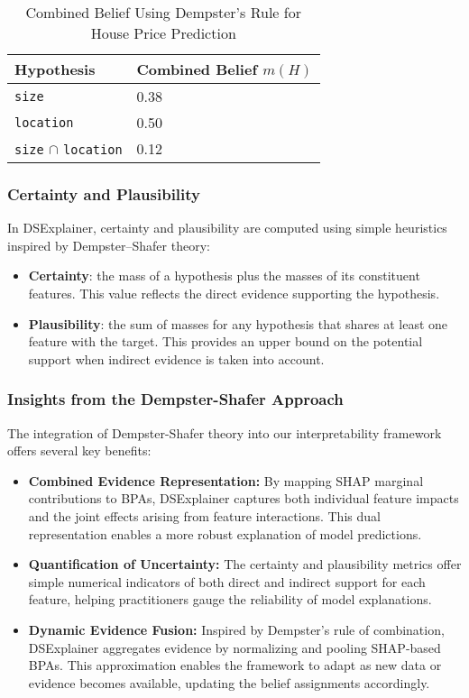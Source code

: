 \documentclass[acmlarge]{acmart}
\begin{document}
\begin{table}[H]
    \caption{Combined Belief Using Dempster's Rule for House Price Prediction}
    \label{tab:combined_belief}
    \centering
    \begin{tabularx}{\textwidth}{|Y|Y|}
        \hline
        \textbf{Hypothesis} & \textbf{Combined Belief \( m(H) \)} \\
        \hline
        \texttt{size} & 0.38 \\
        \hline
        \texttt{location} & 0.50 \\
        \hline
        \texttt{size} \(\cap\) \texttt{location} & 0.12 \\
        \hline
    \end{tabularx}
\end{table}

\subsubsection{Certainty and Plausibility}

In DSExplainer, certainty and plausibility are computed using simple heuristics inspired by Dempster--Shafer theory:
\begin{itemize}
    \item \textbf{Certainty}: the mass of a hypothesis plus the masses of its constituent features. This value reflects the direct evidence supporting the hypothesis.
    \item \textbf{Plausibility}: the sum of masses for any hypothesis that shares at least one feature with the target. This provides an upper bound on the potential support when indirect evidence is taken into account.
\end{itemize}



\subsubsection{Insights from the Dempster-Shafer Approach}

The integration of Dempster-Shafer theory into our interpretability framework offers several key benefits:
\begin{itemize}
    \item \textbf{Combined Evidence Representation:} By mapping SHAP marginal contributions to BPAs, DSExplainer captures both individual feature impacts and the joint effects arising from feature interactions. This dual representation enables a more robust explanation of model predictions.
    \item \textbf{Quantification of Uncertainty:} The certainty and plausibility metrics offer simple numerical indicators of both direct and indirect support for each feature, helping practitioners gauge the reliability of model explanations.
    \item \textbf{Dynamic Evidence Fusion:} Inspired by Dempster's rule of combination, DSExplainer aggregates evidence by normalizing and pooling SHAP-based BPAs. This approximation enables the framework to adapt as new data or evidence becomes available, updating the belief assignments accordingly.

\end{itemize}
\end{document}
